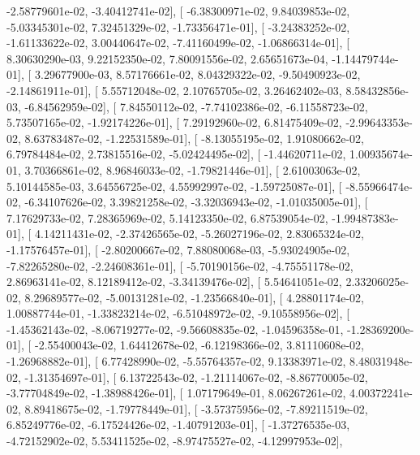 \documentclass{article}
\begin{document}
         -2.58779601e-02,  -3.40412741e-02],
       [ -6.38300971e-02,   9.84039853e-02,  -5.03345301e-02,
          7.32451329e-02,  -1.73356471e-01],
       [ -3.24383252e-02,  -1.61133622e-02,   3.00440647e-02,
         -7.41160499e-02,  -1.06866314e-01],
       [  8.30630290e-03,   9.22152350e-02,   7.80091556e-02,
          2.65651673e-04,  -1.14479744e-01],
       [  3.29677900e-03,   8.57176661e-02,   8.04329322e-02,
         -9.50490923e-02,  -2.14861911e-01],
       [  5.55712048e-02,   2.10765705e-02,   3.26462402e-03,
          8.58432856e-03,  -6.84562959e-02],
       [  7.84550112e-02,  -7.74102386e-02,  -6.11558723e-02,
          5.73507165e-02,  -1.92174226e-01],
       [  7.29192960e-02,   6.81475409e-02,  -2.99643353e-02,
          8.63783487e-02,  -1.22531589e-01],
       [ -8.13055195e-02,   1.91080662e-02,   6.79784484e-02,
          2.73815516e-02,  -5.02424495e-02],
       [ -1.44620711e-02,   1.00935674e-01,   3.70366861e-02,
          8.96846033e-02,  -1.79821446e-01],
       [  2.61003063e-02,   5.10144585e-03,   3.64556725e-02,
          4.55992997e-02,  -1.59725087e-01],
       [ -8.55966474e-02,  -6.34107626e-02,   3.39821258e-02,
         -3.32036943e-02,  -1.01035005e-01],
       [  7.17629733e-02,   7.28365969e-02,   5.14123350e-02,
          6.87539054e-02,  -1.99487383e-01],
       [  4.14211431e-02,  -2.37426565e-02,  -5.26027196e-02,
          2.83065324e-02,  -1.17576457e-01],
       [ -2.80200667e-02,   7.88080068e-03,  -5.93024905e-02,
         -7.82265280e-02,  -2.24608361e-01],
       [ -5.70190156e-02,  -4.75551178e-02,   2.86963141e-02,
          8.12189412e-02,  -3.34139476e-02],
       [  5.54641051e-02,   2.33206025e-02,   8.29689577e-02,
         -5.00131281e-02,  -1.23566840e-01],
       [  4.28801174e-02,   1.00887744e-01,  -1.33823214e-02,
         -6.51048972e-02,  -9.10558956e-02],
       [ -1.45362143e-02,  -8.06719277e-02,  -9.56608835e-02,
         -1.04596358e-01,  -1.28369200e-01],
       [ -2.55400043e-02,   1.64412678e-02,  -6.12198366e-02,
          3.81110608e-02,  -1.26968882e-01],
       [  6.77428990e-02,  -5.55764357e-02,   9.13383971e-02,
          8.48031948e-02,  -1.31354697e-01],
       [  6.13722543e-02,  -1.21114067e-02,  -8.86770005e-02,
         -3.77704849e-02,  -1.38988426e-01],
       [  1.07179649e-01,   8.06267261e-02,   4.00372241e-02,
          8.89418675e-02,  -1.79778449e-01],
       [ -3.57375956e-02,  -7.89211519e-02,   6.85249776e-02,
         -6.17524426e-02,  -1.40791203e-01],
       [ -1.37276535e-03,  -4.72152902e-02,   5.53411525e-02,
         -8.97475527e-02,  -4.12997953e-02],
\end{document}
